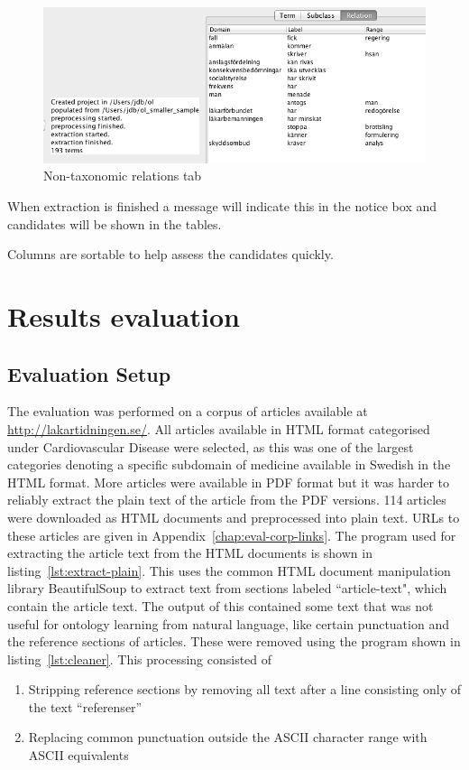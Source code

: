 \documentclass[a4paper]{report}
\begin{document}
\begin{figure}[H]
  \centering
  \includegraphics[width=.8\textwidth]{graphics/9._Non-taxonomic_relations_tab.png}
  \caption{Non-taxonomic relations tab}
  \label{fig:walkthrough9}
\end{figure}
When extraction is finished a message will indicate this in the notice box and candidates will be shown in the tables. 

Columns are sortable to help assess the candidates quickly.

\chapter{Results evaluation}
\label{chap:eval}

\section{Evaluation Setup}
\label{sec:eval:setup}

The evaluation was performed on a corpus of articles available at \url{http://lakartidningen.se/}.
All articles available in HTML format categorised under Cardiovascular Disease were selected, as this was one of the largest categories denoting a specific subdomain of medicine available in Swedish in the HTML format.
More articles were available in PDF format but it was harder to reliably extract the plain text of the article from the PDF versions.
114 articles were downloaded as HTML documents and preprocessed into plain text.
URLs to these articles are given in Appendix~\ref{chap:eval-corp-links}.
The program used for extracting the article text from the HTML documents is shown in listing~\ref{lst:extract-plain}.
This uses the common HTML document manipulation library BeautifulSoup to extract text from sections labeled ``article-text", which contain the article text.
The output of this contained some text that was not useful for ontology learning from natural language, like certain punctuation and the reference sections of articles.
These were removed using the program shown in listing~\ref{lst:cleaner}.
This processing consisted of
\begin{enumerate}
\item Stripping reference sections by removing all text after a line consisting only of the text ``referenser''
\item Replacing common punctuation outside the ASCII character range with ASCII equivalents
\end{enumerate}
\end{document}
